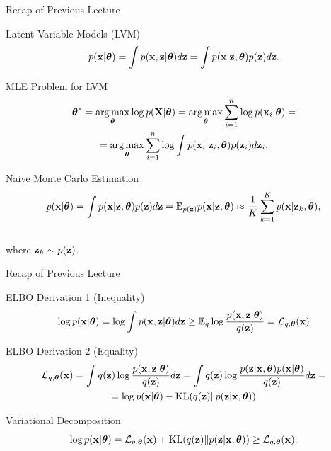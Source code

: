 \documentclass{beamer}
\begin{document}
\begin{frame}{Recap of Previous Lecture}
	\begin{block}{Latent Variable Models (LVM)}
		\vspace{-0.3cm}
		\[
			p(\mathbf{x} | \boldsymbol{\theta}) = \int p(\mathbf{x}, \mathbf{z} | \boldsymbol{\theta}) d\mathbf{z} = \int p(\mathbf{x} | \mathbf{z}, \boldsymbol{\theta}) p(\mathbf{z}) d\mathbf{z}.
		\]
	\end{block}
	\begin{block}{MLE Problem for LVM}
		\vspace{-0.7cm}
		\begin{multline*}
			\boldsymbol{\theta}^* = \operatorname*{arg\,max}_{\boldsymbol{\theta}} \log p(\mathbf{X}| \boldsymbol{\theta}) = \operatorname*{arg\,max}_{\boldsymbol{\theta}} \sum_{i=1}^n \log p(\mathbf{x}_i | \boldsymbol{\theta}) = \\ = \operatorname*{arg\,max}_{\boldsymbol{\theta}}  \sum_{i=1}^n \log \int p(\mathbf{x}_i| \mathbf{z}_i, \boldsymbol{\theta}) p(\mathbf{z}_i) d\mathbf{z}_i.
		\end{multline*}
		\vspace{-0.7cm}
	\end{block}
	\begin{block}{Naive Monte Carlo Estimation}
		\vspace{-0.7cm}
		\[
			p(\mathbf{x} | \boldsymbol{\theta}) = \int p(\mathbf{x} | \mathbf{z}, \boldsymbol{\theta}) p(\mathbf{z}) d\mathbf{z} = \mathbb{E}_{p(\mathbf{z})} p(\mathbf{x} | \mathbf{z}, \boldsymbol{\theta}) \approx \frac{1}{K} \sum_{k=1}^{K} p(\mathbf{x} | \mathbf{z}_k, \boldsymbol{\theta}),
		\]
		\vspace{-0.5cm} \\
		where $\mathbf{z}_k \sim p(\mathbf{z})$. 
	\end{block}
\end{frame}
\begin{frame}{Recap of Previous Lecture}
	\begin{block}{ELBO Derivation 1 (Inequality)}
		\vspace{-0.3cm}
		\begin{multline*}
			\log p(\mathbf{x}| \boldsymbol{\theta}) 
			= \log \int p(\mathbf{x}, \mathbf{z} | \boldsymbol{\theta}) d\mathbf{z} \geq \mathbb{E}_{q} \log \frac{p(\mathbf{x}, \mathbf{z}| \boldsymbol{\theta})}{q(\mathbf{z})} = \mathcal{L}_{q, \boldsymbol{\theta}}(\mathbf{x})
		\end{multline*}
		\vspace{-0.3cm}
	\end{block}
	\begin{block}{ELBO Derivation 2 (Equality)}
		\vspace{-0.3cm}
		\begin{multline*}
			\mathcal{L}_{q, \boldsymbol{\theta}}(\mathbf{x}) = \int q(\mathbf{z}) \log \frac{p(\mathbf{x}, \mathbf{z} | \boldsymbol{\theta})}{q(\mathbf{z})}d\mathbf{z} = 
			\int q(\mathbf{z}) \log \frac{p(\mathbf{z}|\mathbf{x}, \boldsymbol{\theta})p(\mathbf{x}| \boldsymbol{\theta})}{q(\mathbf{z})}d\mathbf{z} = \\
			= \log p(\mathbf{x}| \boldsymbol{\theta}) - \mathrm{KL}(q(\mathbf{z}) \| p(\mathbf{z}|\mathbf{x}, \boldsymbol{\theta}))
		\end{multline*}
	\end{block}
	\vspace{-0.3cm}
	\begin{block}{Variational Decomposition}
		\[
		\log p(\mathbf{x}| \boldsymbol{\theta}) = \mathcal{L}_{q, \boldsymbol{\theta}}(\mathbf{x}) + \mathrm{KL}(q(\mathbf{z}) \| p(\mathbf{z}|\mathbf{x}, \boldsymbol{\theta})) \geq \mathcal{L}_{q, \boldsymbol{\theta}}(\mathbf{x}).
		\]
	\end{block}
\end{frame}
\end{document}
